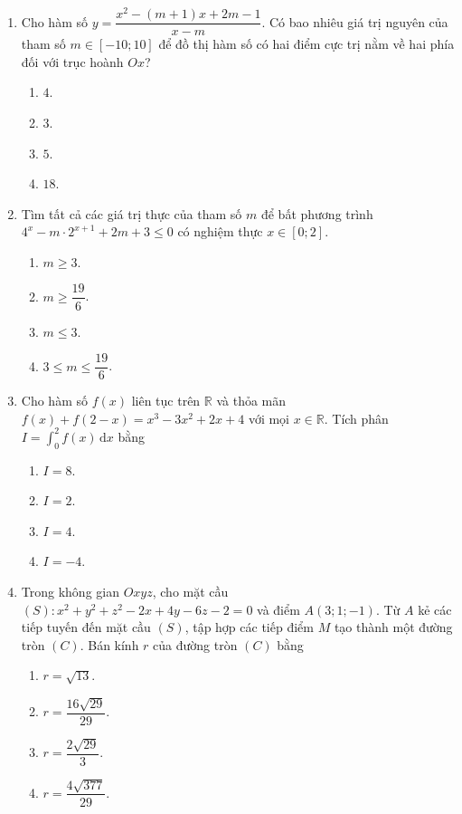 \documentclass[12pt,a4paper]{article}
\begin{document}
\begin{enumerate}[label=\textbf{Câu \arabic*:}, leftmargin=*]

\item Cho hàm số $y = \dfrac{x^2 - (m+1)x + 2m - 1}{x - m}$. Có bao nhiêu giá trị nguyên của tham số $m \in [-10; 10]$ để đồ thị hàm số có hai điểm cực trị nằm về hai phía đối với trục hoành $Ox$?
\begin{enumerate}[label=\Alph*.]
    \item $4$.
    \item $3$.
    \item $5$.
    \item $18$.
\end{enumerate}

\item Tìm tất cả các giá trị thực của tham số $m$ để bất phương trình $4^x - m \cdot 2^{x+1} + 2m + 3 \le 0$ có nghiệm thực $x \in [0; 2]$.
\begin{enumerate}[label=\Alph*.]
    \item $m \ge 3$.
    \item $m \ge \dfrac{19}{6}$.
    \item $m \le 3$.
    \item $3 \le m \le \dfrac{19}{6}$.
\end{enumerate}

\item Cho hàm số $f(x)$ liên tục trên $\mathbb{R}$ và thỏa mãn $f(x) + f(2-x) = x^3 - 3x^2 + 2x + 4$ với mọi $x \in \mathbb{R}$. Tích phân $I = \int_0^2 f(x) \, \mathrm{d}x$ bằng
\begin{enumerate}[label=\Alph*.]
    \item $I = 8$.
    \item $I = 2$.
    \item $I = 4$.
    \item $I = -4$.
\end{enumerate}

\item Trong không gian $Oxyz$, cho mặt cầu $(S): x^2 + y^2 + z^2 - 2x + 4y - 6z - 2 = 0$ và điểm $A(3; 1; -1)$. Từ $A$ kẻ các tiếp tuyến đến mặt cầu $(S)$, tập hợp các tiếp điểm $M$ tạo thành một đường tròn $(C)$. Bán kính $r$ của đường tròn $(C)$ bằng
\begin{enumerate}[label=\Alph*.]
    \item $r = \sqrt{13}$.
    \item $r = \dfrac{16\sqrt{29}}{29}$.
    \item $r = \dfrac{2\sqrt{29}}{3}$.
    \item $r = \dfrac{4\sqrt{377}}{29}$.
\end{enumerate}


\end{enumerate}
\end{document}
